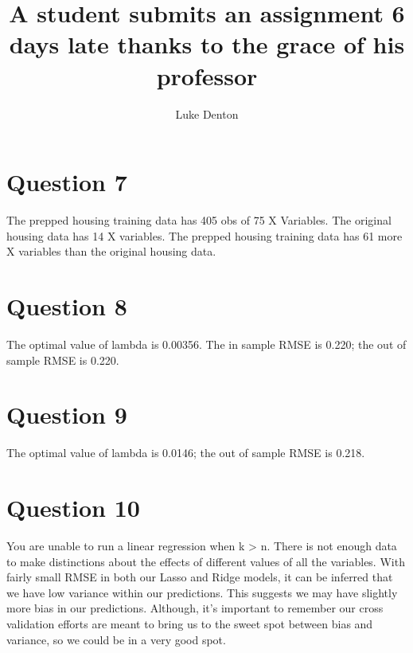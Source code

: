 \documentclass{homework}
\title{A student submits an assignment 6 days late thanks to the grace of his professor}
\author{Luke Denton}
\begin{document}
\maketitle

\section{Question 7}
The prepped housing training data has 405 obs of 75 X Variables. The original housing data has 14 X variables. The prepped housing training data has 61 more X variables than the original housing data.

\section{Question 8}
The optimal value of lambda is 0.00356. The in sample RMSE is 0.220; the out of sample RMSE is 0.220.

\section{Question 9}
The optimal value of lambda is 0.0146; the out of sample RMSE is 0.218.

\section{Question 10}
You are unable to run a linear regression when k > n. There is not enough data to make distinctions about the effects of different values of all the variables. With fairly small RMSE in both our Lasso and Ridge models, it can be inferred that we have low variance within our predictions. This suggests we may have slightly more bias in our predictions. Although, it's important to remember our cross validation efforts are meant to bring us to the sweet spot between bias and variance, so we could be in a very good spot. 
\end{document}
